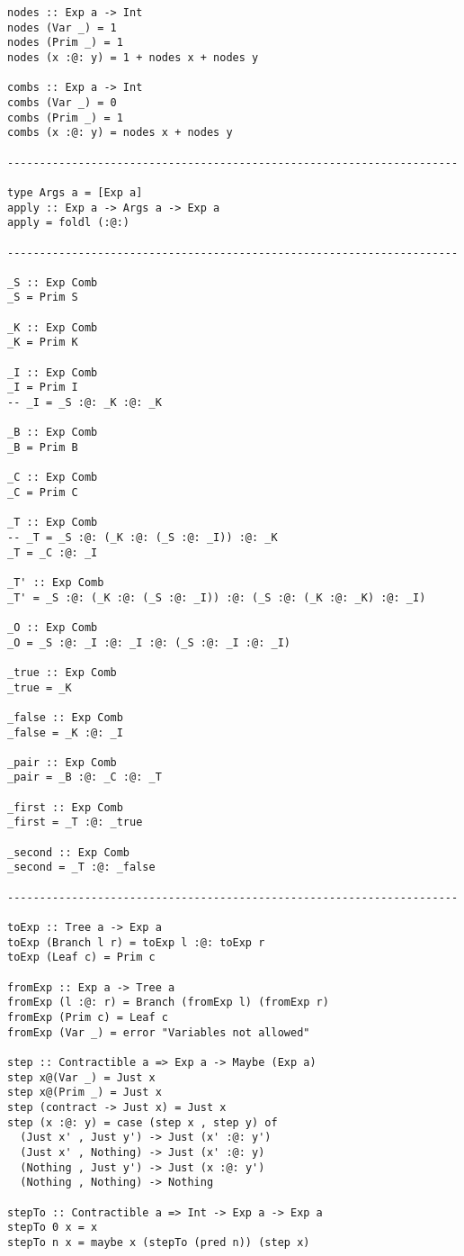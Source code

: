 \documentclass{article}
\begin{document}
\begin{lstlisting}
nodes :: Exp a -> Int
nodes (Var _) = 1
nodes (Prim _) = 1
nodes (x :@: y) = 1 + nodes x + nodes y

combs :: Exp a -> Int
combs (Var _) = 0
combs (Prim _) = 1
combs (x :@: y) = nodes x + nodes y

----------------------------------------------------------------------

type Args a = [Exp a]
apply :: Exp a -> Args a -> Exp a
apply = foldl (:@:)

----------------------------------------------------------------------

_S :: Exp Comb
_S = Prim S

_K :: Exp Comb
_K = Prim K

_I :: Exp Comb
_I = Prim I
-- _I = _S :@: _K :@: _K

_B :: Exp Comb
_B = Prim B

_C :: Exp Comb
_C = Prim C

_T :: Exp Comb
-- _T = _S :@: (_K :@: (_S :@: _I)) :@: _K
_T = _C :@: _I

_T' :: Exp Comb
_T' = _S :@: (_K :@: (_S :@: _I)) :@: (_S :@: (_K :@: _K) :@: _I)

_O :: Exp Comb
_O = _S :@: _I :@: _I :@: (_S :@: _I :@: _I)

_true :: Exp Comb
_true = _K

_false :: Exp Comb
_false = _K :@: _I

_pair :: Exp Comb
_pair = _B :@: _C :@: _T

_first :: Exp Comb
_first = _T :@: _true

_second :: Exp Comb
_second = _T :@: _false

----------------------------------------------------------------------

toExp :: Tree a -> Exp a
toExp (Branch l r) = toExp l :@: toExp r
toExp (Leaf c) = Prim c

fromExp :: Exp a -> Tree a
fromExp (l :@: r) = Branch (fromExp l) (fromExp r)
fromExp (Prim c) = Leaf c
fromExp (Var _) = error "Variables not allowed"

step :: Contractible a => Exp a -> Maybe (Exp a)
step x@(Var _) = Just x
step x@(Prim _) = Just x
step (contract -> Just x) = Just x
step (x :@: y) = case (step x , step y) of
  (Just x' , Just y') -> Just (x' :@: y')
  (Just x' , Nothing) -> Just (x' :@: y)
  (Nothing , Just y') -> Just (x :@: y')
  (Nothing , Nothing) -> Nothing

stepTo :: Contractible a => Int -> Exp a -> Exp a
stepTo 0 x = x
stepTo n x = maybe x (stepTo (pred n)) (step x)


\end{lstlisting}
\end{document}
